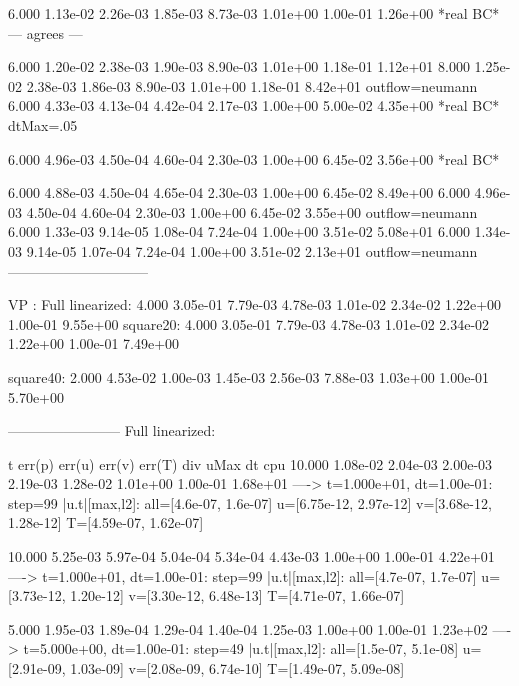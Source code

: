 {   6.000 1.13e-02 2.26e-03 1.85e-03 8.73e-03  1.01e+00 1.00e-01 1.26e+00  *real BC* --- agrees ---

   6.000 1.20e-02 2.38e-03 1.90e-03 8.90e-03  1.01e+00 1.18e-01 1.12e+01
   8.000 1.25e-02 2.38e-03 1.86e-03 8.90e-03  1.01e+00 1.18e-01 8.42e+01  outflow=neumann
   6.000 4.33e-03 4.13e-04 4.42e-04 2.17e-03  1.00e+00 5.00e-02 4.35e+00  *real BC* dtMax=.05

   6.000 4.96e-03 4.50e-04 4.60e-04 2.30e-03  1.00e+00 6.45e-02 3.56e+00  *real BC*

   6.000 4.88e-03 4.50e-04 4.65e-04 2.30e-03  1.00e+00 6.45e-02 8.49e+00
   6.000 4.96e-03 4.50e-04 4.60e-04 2.30e-03  1.00e+00 6.45e-02 3.55e+00  outflow=neumann
   6.000 1.33e-03 9.14e-05 1.08e-04 7.24e-04  1.00e+00 3.51e-02 5.08e+01
   6.000 1.34e-03 9.14e-05 1.07e-04 7.24e-04  1.00e+00 3.51e-02 2.13e+01  outflow=neumann
------------------------------



VP : Full linearized:
   4.000 3.05e-01 7.79e-03 4.78e-03 1.01e-02 2.34e-02  1.22e+00 1.00e-01 9.55e+00
square20:
   4.000 3.05e-01 7.79e-03 4.78e-03 1.01e-02 2.34e-02  1.22e+00 1.00e-01 7.49e+00

square40: 
   2.000 4.53e-02 1.00e-03 1.45e-03 2.56e-03 7.88e-03  1.03e+00 1.00e-01 5.70e+00

------------------------
Full linearized:

     t    err(p)   err(u)   err(v)   err(T)    div       uMax     dt       cpu
  10.000 1.08e-02 2.04e-03 2.00e-03 2.19e-03 1.28e-02  1.01e+00 1.00e-01 1.68e+01
 ----> t=1.000e+01, dt=1.00e-01: step=99 |u.t|[max,l2]: all=[4.6e-07, 1.6e-07] u=[6.75e-12, 2.97e-12] v=[3.68e-12, 1.28e-12] T=[4.59e-07, 1.62e-07]


  10.000 5.25e-03 5.97e-04 5.04e-04 5.34e-04 4.43e-03  1.00e+00 1.00e-01 4.22e+01
 ----> t=1.000e+01, dt=1.00e-01: step=99 |u.t|[max,l2]: all=[4.7e-07, 1.7e-07] u=[3.73e-12, 1.20e-12] v=[3.30e-12, 6.48e-13] T=[4.71e-07, 1.66e-07]

  5.000 1.95e-03 1.89e-04 1.29e-04 1.40e-04 1.25e-03  1.00e+00 1.00e-01 1.23e+02
 ----> t=5.000e+00, dt=1.00e-01: step=49 |u.t|[max,l2]: all=[1.5e-07, 5.1e-08] u=[2.91e-09, 1.03e-09] v=[2.08e-09, 6.74e-10] T=[1.49e-07, 5.09e-08]

}
